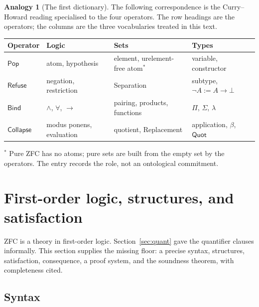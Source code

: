 \documentclass[11pt]{article}
\newcommand{\Pop}{\mathsf{Pop}}
\newcommand{\Refuse}{\mathsf{Refuse}}
\newcommand{\Bind}{\mathsf{Bind}}
\newcommand{\Coll}{\mathsf{Collapse}}
\newcommand{\Quot}{\mathsf{Quot}}
\theoremstyle{definition}
\newtheorem{analogy}[definition]{Analogy}
\theoremstyle{plain}
\theoremstyle{remark}
\begin{document}
\begin{analogy}[The first dictionary]\label{an:dict1}
The following correspondence is the Curry--Howard reading specialised to the four operators. The row headings are the operators; the columns are the three vocabularies treated in this text.
\begin{center}
\begin{tabular}{@{}p{}p{}p{}p{}@{}}
\toprule
Operator & Logic & Sets & Types\\
\midrule
$\Pop$ & atom, hypothesis & element, urelement-free atom$^{*}$ & variable, constructor\\
$\Refuse$ & negation, restriction & Separation & subtype, $\neg A:=A\to\bot$\\
$\Bind$ & $\wedge$, $\forall$, $\to$ & pairing, products, functions & $\Pi$, $\Sigma$, $\lambda$\\
$\Coll$ & modus ponens, evaluation & quotient, Replacement & application, $\beta$, $\Quot$\\
\bottomrule
\end{tabular}
\end{center}
$^{*}$ Pure ZFC has no atoms; pure sets are built from the empty set by the operators. The entry records the role, not an ontological commitment.
\end{analogy}

\section{First-order logic, structures, and satisfaction}\label{sec:fol}

ZFC is a theory in first-order logic. Section~\ref{sec:quant} gave the quantifier clauses informally. This section supplies the missing floor: a precise syntax, structures, satisfaction, consequence, a proof system, and the soundness theorem, with completeness cited.

\subsection{Syntax}
\end{document}
